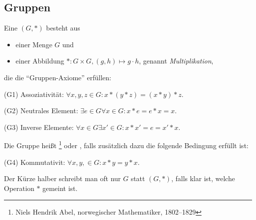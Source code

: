 
\subsection{Gruppen}\label{sec:groups}

\begin{definition}[Gruppen]
    \label{gruppen:def}
    Eine  $(G,*)$ besteht aus
    \begin{itemize}
        \item einer Menge $G$ und
        \item einer Abbildung $*: G\times G, (g,h) \mapsto g\cdot h$, genannt \emph{Multiplikation},
    \end{itemize}
    die die \enquote{Gruppen-Axiome} erfüllen:

    \begin{description}
        \item{(G1)} Assoziativität: $\forall x,y,z\in G: x\ast (y\ast z)=(x\ast y)\ast z$.
        \item{(G2)} Neutrales Element: $\exists e \in G \forall x\in G: x\ast e=e\ast x=x$.
        \item{(G3)} Inverse Elemente: $\forall x \in G \exists x' \in G: x\ast x' = e = x'\ast x$.
    \end{description}
    Die Gruppe heißt \footnote{Niels Hendrik Abel, norwegischer Mathematiker, 1802--1829} oder , falls zusätzlich dazu die folgende Bedingung erfüllt ist:
    \begin{description}
        \item{(G4)} Kommutativit: $\forall x,y,\in G: x\ast y=y\ast x$.
    \end{description}

    Der Kürze halber schreibt man oft nur $G$ statt $(G,\ast)$, falls klar ist, welche Operation $\ast$ gemeint ist.
\end{definition}

